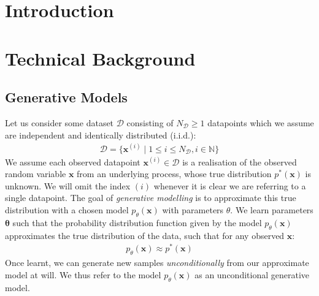 \documentclass[ oneside,%
                    author={George Herbert},
                    degree={MSci},
                     title={Diffusion Models for Time-Evolving Precipitation Fields},
                  subtitle={}]{dissertation}
\begin{document}
%

\mainmatter


\chapter{Introduction}
\label{chap:introduction}

\chapter{Technical Background}
\label{chap:background}

\section{Generative Models}
\label{sec:background_generative}

Let us consider some dataset $\mathcal{D}$ consisting of $N_{\mathcal{D}}\ge1$ datapoints which we assume are independent and identically distributed (i.i.d.):
\begin{align}
      \mathcal{D}=\{\mathbf{x}^{(i)}\mid 1 \le i \le N_{\mathcal{D}}, i \in \mathbb{N} \}
\end{align}
We assume each observed datapoint $\mathbf{x}^{(i)}\in\mathcal{D}$ is a realisation of the observed random variable $\mathbf{x}$ from an underlying process, whose true distribution $p^*(\mathbf{x})$ is unknown. We will omit the index $(i)$ whenever it is clear we are referring to a single datapoint. The goal of \textit{generative modelling} is to approximate this true distribution with a chosen model $p_\theta(\mathbf{x})$ with parameters $\theta$. We learn parameters $\mathbf{\theta}$ such that the probability distribution function given by the model $p_\theta(\mathbf{x})$ approximates the true distribution of the data, such that for any observed $\mathbf{x}$:
\begin{align}
      p_\theta(\mathbf{x}) \approx p^*(\mathbf{x})
\end{align}
Once learnt, we can generate new samples \textit{unconditionally} from our approximate model at will. We thus refer to the model $p_\theta(\mathbf{x})$ as an unconditional generative model.
\end{document}

